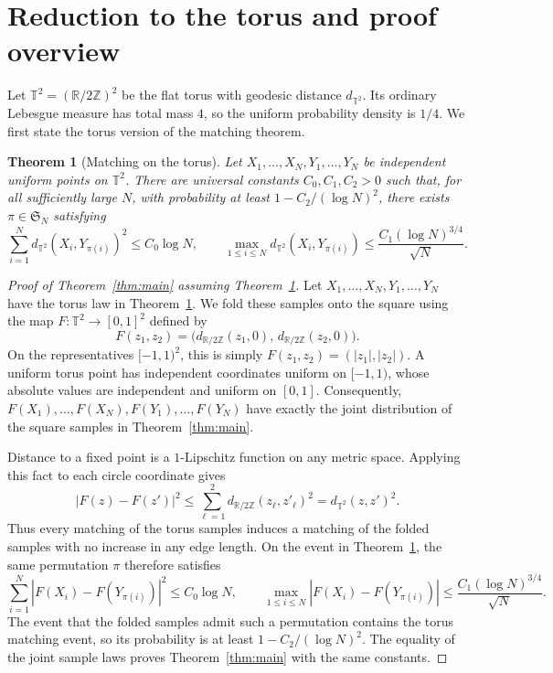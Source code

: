 \documentclass[11pt]{article}
\newcommand{\R}{\mathbb R}
\newcommand{\Z}{\mathbb Z}
\newcommand{\T}{\mathbb T^2}
\newtheorem{theorem}{Theorem}[section]
\theoremstyle{remark}
\numberwithin{equation}{section}
\begin{document}
\section{Reduction to the torus and proof overview}
\label{sec:proof-structure}

Let \(\T=(\R/2\Z)^2\) be the flat torus with geodesic distance
\(d_{\T}\). Its ordinary Lebesgue measure has total mass \(4\), so
the uniform probability density is \(1/4\). We first state the torus
version of the matching theorem.

\begin{theorem}[Matching on the torus]
\label{thm:torus}
Let \(X_1,\ldots,X_N,Y_1,\ldots,Y_N\) be independent uniform
points on \(\T\). There are universal constants \(C_0,C_1,C_2>0\)
such that, for all sufficiently large \(N\), with probability at least
\(1-C_2/(\log N)^2\), there exists \(\pi\in\mathfrak S_N\)
satisfying
\[
 \sum_{i=1}^N d_{\T}(X_i,Y_{\pi(i)})^2\le C_0\log N,
 \qquad
 \max_{1\le i\le N}d_{\T}(X_i,Y_{\pi(i)})
 \le\frac{C_1(\log N)^{3/4}}{\sqrt N}.
\]
\end{theorem}

\begin{proof}[Proof of Theorem~\ref{thm:main} assuming Theorem~\ref{thm:torus}]
Let \(X_1,\ldots,X_N,Y_1,\ldots,Y_N\) have the torus law in
Theorem~\ref{thm:torus}. We fold these samples onto the square using
the map \(F:\T\to[0,1]^2\) defined by
\[
 F(z_1,z_2)=
 \bigl(d_{\R/2\Z}(z_1,0),\,d_{\R/2\Z}(z_2,0)\bigr).
\]
On the representatives \([-1,1)^2\), this is simply
\(F(z_1,z_2)=(|z_1|,|z_2|)\). A uniform torus point has independent
coordinates uniform on \([-1,1)\), whose absolute values are
independent and uniform on \([0,1]\). Consequently,
\(F(X_1),\ldots,F(X_N),F(Y_1),\ldots,F(Y_N)\) have exactly the
joint distribution of the square samples in Theorem~\ref{thm:main}.

Distance to a fixed point is a \(1\)-Lipschitz function on any metric
space. Applying this fact to each circle coordinate gives
\[
 |F(z)-F(z')|^2
 \le\sum_{\ell=1}^2d_{\R/2\Z}(z_\ell,z'_\ell)^2
 =d_{\T}(z,z')^2.
\]
Thus every matching of the torus samples induces a matching of the
folded samples with no increase in any edge length. On the event in
Theorem~\ref{thm:torus}, the same permutation \(\pi\) therefore satisfies
\[
 \sum_{i=1}^N|F(X_i)-F(Y_{\pi(i)})|^2\le C_0\log N,
 \qquad
 \max_{1\le i\le N}|F(X_i)-F(Y_{\pi(i)})|
 \le\frac{C_1(\log N)^{3/4}}{\sqrt N}.
\]
The event that the folded samples admit such a permutation contains
the torus matching event, so its probability is at least
\(1-C_2/(\log N)^2\). The equality of the joint sample laws proves
Theorem~\ref{thm:main} with the same constants.
\end{proof}
\end{document}

